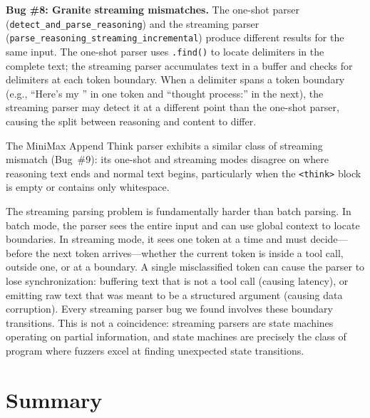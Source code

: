 \begin{bugbox}
\textbf{Bug \#8: Granite streaming mismatches.} The one-shot parser (\texttt{detect\_and\_parse\_reasoning}) and the streaming parser (\texttt{parse\_reasoning\_streaming\_incremental}) produce different results for the same input. The one-shot parser uses \texttt{.find()} to locate delimiters in the complete text; the streaming parser accumulates text in a buffer and checks for delimiters at each token boundary. When a delimiter spans a token boundary (e.g., ``Here's my '' in one token and ``thought process:'' in the next), the streaming parser may detect it at a different point than the one-shot parser, causing the split between reasoning and content to differ.
\end{bugbox}

The MiniMax Append Think parser exhibits a similar class of streaming mismatch (Bug~\#9): its one-shot and streaming modes disagree on where reasoning text ends and normal text begins, particularly when the \texttt{<think>} block is empty or contains only whitespace.

\begin{insightbox}
The streaming parsing problem is fundamentally harder than batch parsing. In batch mode, the parser sees the entire input and can use global context to locate boundaries. In streaming mode, it sees one token at a time and must decide---before the next token arrives---whether the current token is inside a tool call, outside one, or at a boundary. A single misclassified token can cause the parser to lose synchronization: buffering text that is not a tool call (causing latency), or emitting raw text that was meant to be a structured argument (causing data corruption). Every streaming parser bug we found involves these boundary transitions. This is not a coincidence: streaming parsers are state machines operating on partial information, and state machines are precisely the class of program where fuzzers excel at finding unexpected state transitions.
\end{insightbox}

\section{Summary}
\label{sec:codecs:summary}

